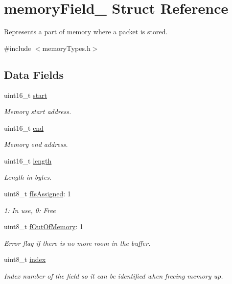 \hypertarget{structmemory_field__}{}\section{memory\+Field\+\_\+ Struct Reference}
\label{structmemory_field__}


Represents a part of memory where a packet is stored.  




{\ttfamily \#include $<$memory\+Types.\+h$>$}

\subsection*{Data Fields}
\begin{DoxyCompactItemize}
\item 
uint16\+\_\+t \mbox{\hyperlink{structmemory_field___a171a2b5d11b1a5891c38a98ac731a161}{start}}
\begin{DoxyCompactList}\small\item\em Memory start address. \end{DoxyCompactList}\item 
uint16\+\_\+t \mbox{\hyperlink{structmemory_field___afbcd798d035e37e733b567c2b0cb96dc}{end}}
\begin{DoxyCompactList}\small\item\em Memory end address. \end{DoxyCompactList}\item 
uint16\+\_\+t \mbox{\hyperlink{structmemory_field___a1892eba2086d12ac2b09005aeb09ea3b}{length}}
\begin{DoxyCompactList}\small\item\em Length in bytes. \end{DoxyCompactList}\item 
uint8\+\_\+t \mbox{\hyperlink{structmemory_field___a36ed4d8e7e2e5f308044e7b422a80028}{f\+Is\+Assigned}}\+: 1
\begin{DoxyCompactList}\small\item\em 1\+: In use, 0\+: Free \end{DoxyCompactList}\item 
uint8\+\_\+t \mbox{\hyperlink{structmemory_field___a90bc80d5fb22db8fba7b5601b9336395}{f\+Out\+Of\+Memory}}\+: 1
\begin{DoxyCompactList}\small\item\em Error flag if there is no more room in the buffer. \end{DoxyCompactList}\item 
uint8\+\_\+t \mbox{\hyperlink{structmemory_field___aae5a12e607d0f782506d9e6ec6179c64}{index}}
\begin{DoxyCompactList}\small\item\em Index number of the field so it can be identified when freeing memory up. \end{DoxyCompactList}\end{DoxyCompactItemize}


